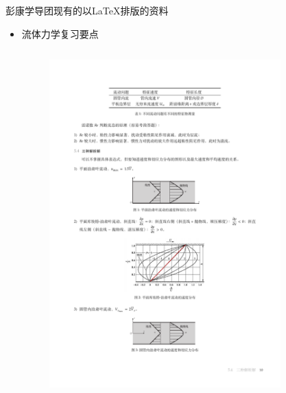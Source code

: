 \begin{frame}{彭康学导团现有的以\LaTeX 排版的资料}
    \begin{itemize}
        \item 流体力学复习要点 
        \begin{columns}
            \begin{column}{0.48\textwidth}
                \begin{figure}
                    \centering
                    \includegraphics[scale=0.2]{figures/PK_LL1.pdf}
                \end{figure}
            \end{column}
            \begin{column}{0.48\textwidth}
                \begin{figure}
                    \centering

\end{figure}
\end{column}
\end{columns}
\end{itemize}
\end{frame}
